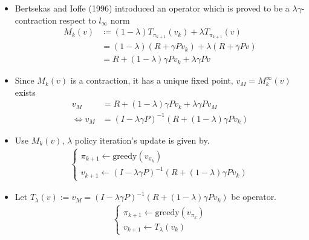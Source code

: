 \documentclass[10pt]{beamer}
\theoremstyle{remark}
\begin{document}
\begin{frame}
    \begin{itemize}
        \item Bertsekas and Ioffe (1996) introduced an operator which is proved to be a $\lambda \gamma$-contraction respect to $l_\infty$ norm
    \begin{align*}
        M_k(v) 
        &\coloneqq  (1 - \lambda) T_{\pi_{k+1}} (v_k) + \lambda T_{\pi_{k+1}} (v) \\
        &=  (1 - \lambda) (R + \gamma P v_k) + \lambda (R + \gamma P v) \\
        &=  R + (1-\lambda) \gamma P v_k + \lambda \gamma P v
    \end{align*} 
\item Since $M_k(v)$ is a contraction, it has a unique fixed point, $v_{M} = M_k^{\infty}(v)$ exists
    \begin{align*}
        v_{M} &= R + (1- \lambda)\gamma P v_k + \lambda \gamma P v_M  \\
        \Leftrightarrow v_M &= (I - \lambda \gamma P)^{-1} (R + (1 - \lambda) \gamma P v_k)
    \end{align*} 
\item Use $M_k(v)$, $\lambda$ policy iteration's update is given by.
    \begin{align*}
    \begin{cases}
        \pi_{k+1} \leftarrow \text{greedy}(v_{\pi_k}) \\
        v_{k+1} \leftarrow (I - \lambda \gamma P)^{-1} (R + (1 - \lambda) \gamma P v_k) 
    \end{cases}
    \end{align*} 
    \item Let $T_\lambda(v) := v_M = (I - \lambda \gamma P)^{-1} (R + (1 - \lambda) \gamma P v_k)$ be operator.
    \begin{align*}
    \begin{cases}
        \pi_{k+1} \leftarrow \text{greedy}(v_{\pi_k}) \\
        v_{k+1} \leftarrow T_\lambda (v_k) 
    \end{cases}
    \end{align*} 
    \end{itemize}
\end{frame}
\end{document}
